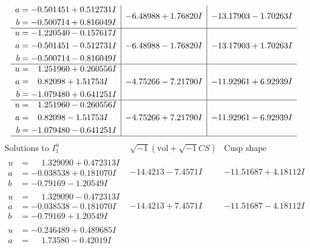 \documentclass[1p]{elsarticle_modified}
\theoremstyle{definition}
\newcommand{\I}{\sqrt{-1}}
\begin{document}
$$\begin{array}{c|c|c}
\begin{aligned}
a &= -0.501451 + 0.512731 I \\
b &= -0.500714 + 0.816049 I\end{aligned}
 & -6.48988 + 1.76820 I & -13.17903 - 1.70263 I \\ \hline\begin{aligned}
u &= -1.220540 - 0.157617 I \\
a &= -0.501451 - 0.512731 I \\
b &= -0.500714 - 0.816049 I\end{aligned}
 & -6.48988 - 1.76820 I & -13.17903 + 1.70263 I \\ \hline\begin{aligned}
u &= \phantom{-}1.251960 + 0.260556 I \\
a &= \phantom{-}0.82098 + 1.51753 I \\
b &= -1.079480 + 0.641251 I\end{aligned}
 & -4.75266 - 7.21790 I & -11.92961 + 6.92939 I \\ \hline\begin{aligned}
u &= \phantom{-}1.251960 - 0.260556 I \\
a &= \phantom{-}0.82098 - 1.51753 I \\
b &= -1.079480 - 0.641251 I\end{aligned}
 & -4.75266 + 7.21790 I & -11.92961 - 6.92939 I\\
 \hline 
 \end{array}$$\newpage$$\begin{array}{c|c|c}  
\text{Solutions to }I^u_{1}& \I (\text{vol} + \sqrt{-1}CS) & \text{Cusp shape}\\
 \hline 
\begin{aligned}
u &= \phantom{-}1.329090 + 0.472313 I \\
a &= -0.038538 + 0.181070 I \\
b &= -0.79169 - 1.20549 I\end{aligned}
 & -14.4213 - 7.4571 I & -11.51687 + 4.18112 I \\ \hline\begin{aligned}
u &= \phantom{-}1.329090 - 0.472313 I \\
a &= -0.038538 - 0.181070 I \\
b &= -0.79169 + 1.20549 I\end{aligned}
 & -14.4213 + 7.4571 I & -11.51687 - 4.18112 I \\ \hline\begin{aligned}
u &= -0.246489 + 0.489685 I \\
a &= \phantom{-}1.73580 - 0.42019 I \\

\end{aligned}
\end{array}$$
\end{document}
